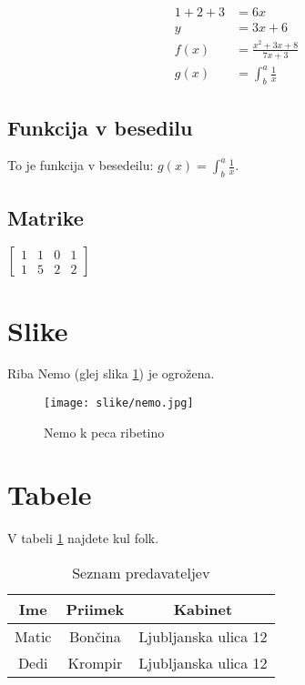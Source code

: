 \documentclass{article}
\begin{document}
\begin{align*}
    1+2+3 &= 6x\\
    y &= 3x + 6\\ %
    f(x) &= \frac{x^2 + 3x + 8}{7x + 3}\\ %
    g(x) &= \int^a_b \frac{1}{x}    
\end{align*}

\subsection{Funkcija v besedilu}
To je funkcija v besedeilu: $g(x) = \int^a_b
\frac{1}{x}$.

\subsection{Matrike}
$ 
\left[
\begin{matrix}
    1 & 1 & 0 & 1\\
    1 & 5 & 2 & 2
\end{matrix}
\right]
$

\newpage
\section{Slike}
Riba Nemo (glej slika \ref{fig:nemo}) je ogrožena.
\begin{figure}[h] %
    \centering
    \texttt{[image: slike/nemo.jpg]}
    \caption{Nemo k peca ribetino}
    \label{fig:nemo}
\end{figure}

\section{Tabele}
V tabeli \ref{tab:seznam} najdete kul folk.
\begin{table}[h]
    \centering
    \begin{tabular}{c c|c}
        \hline
         \textbf{Ime} & \textbf{Priimek} & \textbf{Kabinet}\\
         \hline \hline
         Matic & Bončina & Ljubljanska ulica 12 \\
         Dedi & Krompir & Ljubljanska ulica 12
    \end{tabular}
    \caption{Seznam predavateljev}
    \label{tab:seznam}
\end{table}
\end{document}

